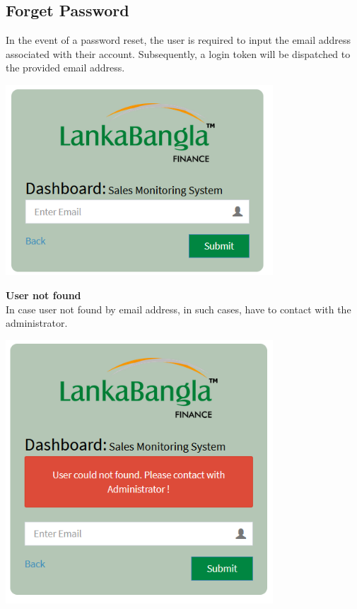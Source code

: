 \documentclass{article}
\begin{document}
\subsection{Forget Password}
In the event of a password reset, the user is required to input the email address associated with their account. Subsequently, a login token will be dispatched to the provided email address.
\begin{center}
    \includegraphics[width=0.75\textwidth]{image/forget_pass_mail_addr.png}
\end{center}



\textbf{User not found}\\
In case user not found by email address, in such cases, have to contact with the administrator. 
\begin{center}
    \includegraphics[width=0.75\textwidth]{image/usernot_found_forget_pass.png}
\end{center}
\end{document}

